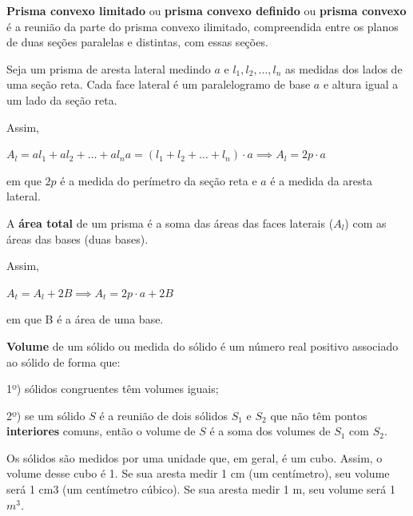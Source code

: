 \textbf{Prisma convexo limitado} ou \textbf{prisma convexo definido} ou \textbf{prisma convexo} é a reunião da parte do prisma convexo ilimitado, compreendida entre os planos de duas seções paralelas e distintas, com essas seções.

Seja um prisma de aresta lateral medindo $a$ e $l_1, l_2, \dots, l_n$ as medidas dos lados de uma seção reta. Cada face lateral é um paralelogramo de base $a$ e altura igual a um lado da seção reta.

Assim,

$A_l = al_1 + al_2 + \dots + al_na = (l_1 + l_2 + \dots + l_n) \cdot a \implies A_l = 2p \cdot a$

em que $2p$ é a medida do perímetro da seção reta e $a$ é a medida da aresta lateral.

A \textbf{área total} de um prisma é a soma das áreas das faces laterais ($A_l$) com as áreas das bases (duas bases).

Assim,

$A_t = A_l + 2B \implies A_t = 2p \cdot a + 2B$

em que B é a área de uma base.

\textbf{Volume} de um sólido ou medida do sólido é um número real positivo associado ao sólido de forma que:

1º) sólidos congruentes têm volumes iguais;

2º) se um sólido $S$ é a reunião de dois sólidos $S_1$ e $S_2$ que não têm pontos \textbf{interiores} comuns, então o volume de $S$ é a soma dos volumes de $S_1$ com $S_2$.

Os sólidos são medidos por uma unidade que, em geral, é um cubo. Assim, o volume desse cubo é 1. Se sua aresta medir 1 cm (um centímetro), seu volume será 1 cm3
(um centímetro cúbico). Se sua aresta medir 1 m, seu volume será 1 $m^3$.




